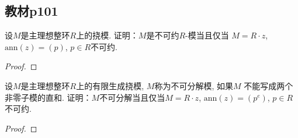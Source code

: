 \subsection{教材p101}

\begin{problem}
    设$M$是主理想整环$R$上的挠模. 证明：$M$是不可约$R$-模当且仅当
$M = R \cdot z$, $\mathrm{ann}(z) = (p)$, $p \in R$不可约.
\end{problem}

\begin{proof}
    
\end{proof}

\begin{problem}
    设$M$是主理想整环$R$上的有限生成挠模, $M$称为不可分解模, 如果$M$
不能写成两个非零子模的直和. 证明：$M$不可分解当且仅当$M = R \cdot z$,
$\mathrm{ann}(z) = (p^e)$, $p \in R$不可约.
\end{problem}

\begin{proof}
    
\end{proof}
